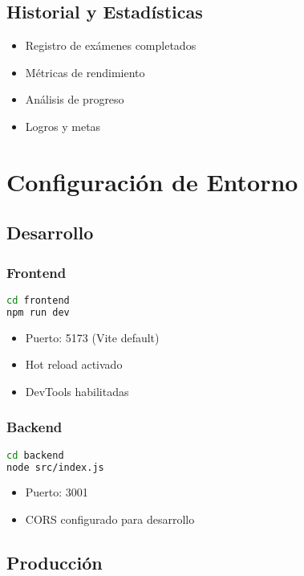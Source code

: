 \documentclass[12pt,a4paper]{report}
\begin{document}
\section{Historial y Estadísticas}
\begin{itemize}
    \item Registro de exámenes completados
    \item Métricas de rendimiento
    \item Análisis de progreso
    \item Logros y metas
\end{itemize}

\chapter{Configuración de Entorno}

\section{Desarrollo}

\subsection{Frontend}
\begin{lstlisting}[language=bash]
cd frontend
npm run dev
\end{lstlisting}

\begin{itemize}
    \item Puerto: 5173 (Vite default)
    \item Hot reload activado
    \item DevTools habilitadas
\end{itemize}

\subsection{Backend}
\begin{lstlisting}[language=bash]
cd backend
node src/index.js
\end{lstlisting}

\begin{itemize}
    \item Puerto: 3001
    \item CORS configurado para desarrollo
\end{itemize}

\section{Producción}
\end{document}
